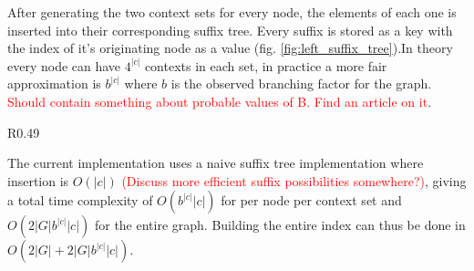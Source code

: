 \documentclass{article}
\begin{document}
After generating the two context sets for every node, the elements of each one is inserted into their corresponding suffix tree. Every suffix is stored as a key with the index of it's originating node as a value (fig. \ref{fig:left_suffix_tree}).In theory every node can have $4^{|c|}$ contexts in each set, in practice a more fair approximation is $b^{|c|}$ where $b$ is the observed branching factor for the graph. \textcolor{red}{Should contain something about probable values of B. Find an article on it}. 
\begin{wrapfigure}{R}{0.49\textwidth}
  \begin{mdframed}
  \end{mdframed}
  \caption{The left suffix tree corresponding to the graph in \ref{fig:explicit_contexts}}
  \label{fig:left_suffix_tree}
\end{wrapfigure}
The current implementation uses a naive suffix tree implementation where insertion is $O(|c|)$ \textcolor{red}{(Discuss more efficient suffix possibilities somewhere?)}, giving a total time complexity of $O(b^{|c|}|c|)$ for per node per context set and $O(2|G|b^{|c|}|c|)$ for the entire graph. Building the entire index can thus be done in $O(2|G| + 2|G|b^{|c|}|c|)$.
\end{document}
